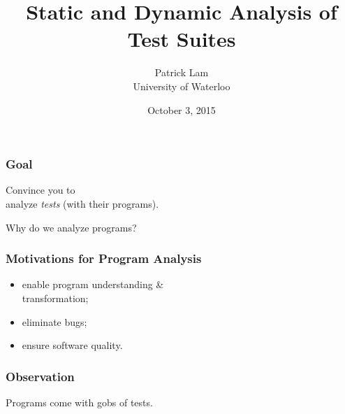 \documentclass{beamer}
\title{Static and Dynamic Analysis of Test Suites}
\author{Patrick Lam\\University of Waterloo}
\date{October 3, 2015}
\newenvironment{changemargin}[1]{%
  \begin{list}{}{%
    \setlength{\topsep}{0pt}%
    \setlength{\leftmargin}{#1}%
    \setlength{\rightmargin}{1em}
    \setlength{\listparindent}{\parindent}%
    \setlength{\itemindent}{\parindent}%
    \setlength{\parsep}{\parskip}%
  }%
  \item[]}{\end{list}}
\begin{document}
\begin{frame}
  \titlepage
\end{frame}

\begin{frame}
  \frametitle{Goal}
  \Large
\begin{center}
Convince you to \\ analyze \emph{tests} (with their programs).
\end{center}
\end{frame}


\begin{frame}
  \centering
  \LARGE
  Why do we analyze programs?
\end{frame}

\begin{frame}
  \frametitle{Motivations for Program Analysis}
  \Large
  \begin{changemargin}{1cm}
    \begin{itemize}
    \item enable program understanding \& \\
 \hspace*{2em} transformation;
    \item eliminate bugs;
    \item ensure software quality.
    \end{itemize}
  \end{changemargin}
\end{frame}


\begin{frame}
  \frametitle{Observation}
  \centering
  \LARGE Programs come with gobs of tests.
\end{frame}
\end{document}

